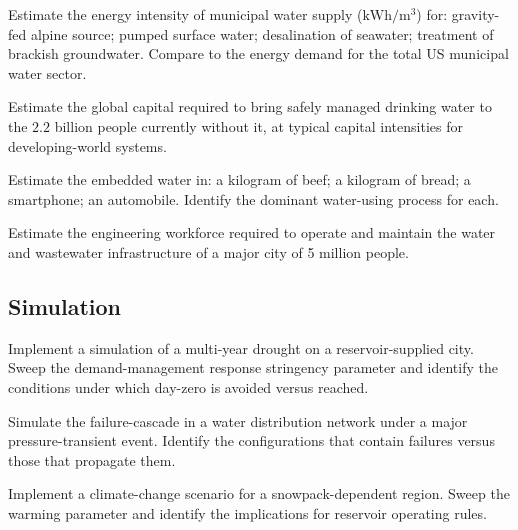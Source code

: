 \begin{exercise}
Estimate the energy intensity of municipal water supply ($\text{kWh}/\text{m}^3$) for: gravity-fed alpine source; pumped surface water; desalination of seawater; treatment of brackish groundwater. Compare to the energy demand for the total US municipal water sector.
\end{exercise}

\begin{exercise}
Estimate the global capital required to bring safely managed drinking water to the $2.2$ billion people currently without it, at typical capital intensities for developing-world systems.
\end{exercise}

\begin{exercise}
Estimate the embedded water in: a kilogram of beef; a kilogram of bread; a smartphone; an automobile. Identify the dominant water-using process for each.
\end{exercise}

\begin{exercise}
Estimate the engineering workforce required to operate and maintain the water and wastewater infrastructure of a major city of 5 million people.
\end{exercise}

\subsection*{Simulation}

\begin{exercise}
Implement a simulation of a multi-year drought on a reservoir-supplied city. Sweep the demand-management response stringency parameter and identify the conditions under which day-zero is avoided versus reached.
\end{exercise}

\begin{exercise}
Simulate the failure-cascade in a water distribution network under a major pressure-transient event. Identify the configurations that contain failures versus those that propagate them.
\end{exercise}

\begin{exercise}
Implement a climate-change scenario for a snowpack-dependent region. Sweep the warming parameter and identify the implications for reservoir operating rules.
\end{exercise}

